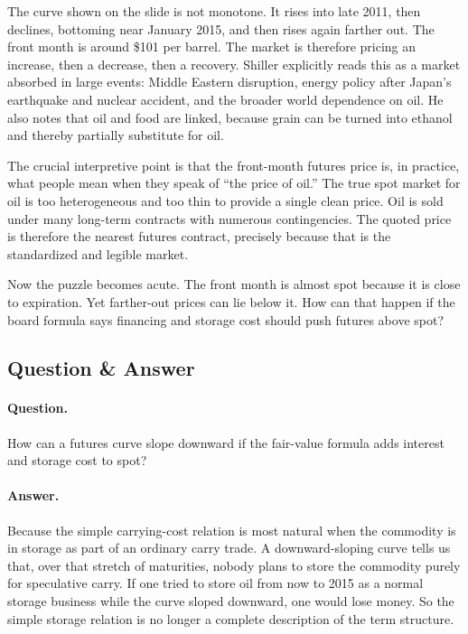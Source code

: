The curve shown on the slide is not monotone. It rises into late 2011, then declines, bottoming near January 2015, and then rises again farther out. The front month is around \$101 per barrel. The market is therefore pricing an increase, then a decrease, then a recovery. Shiller explicitly reads this as a market absorbed in large events: Middle Eastern disruption, energy policy after Japan's earthquake and nuclear accident, and the broader world dependence on oil. He also notes that oil and food are linked, because grain can be turned into ethanol and thereby partially substitute for oil.

The crucial interpretive point is that the front-month futures price is, in practice, what people mean when they speak of ``the price of oil.'' The true spot market for oil is too heterogeneous and too thin to provide a single clean price. Oil is sold under many long-term contracts with numerous contingencies. The quoted price is therefore the nearest futures contract, precisely because that is the standardized and legible market.

Now the puzzle becomes acute. The front month is almost spot because it is close to expiration. Yet farther-out prices can lie below it. How can that happen if the board formula says financing and storage cost should push futures above spot?

\subsection{Question \& Answer}

\paragraph{Question.} How can a futures curve slope downward if the fair-value formula adds interest and storage cost to spot?

\paragraph{Answer.} Because the simple carrying-cost relation is most natural when the commodity is in storage as part of an ordinary carry trade. A downward-sloping curve tells us that, over that stretch of maturities, nobody plans to store the commodity purely for speculative carry. If one tried to store oil from now to 2015 as a normal storage business while the curve sloped downward, one would lose money. So the simple storage relation is no longer a complete description of the term structure.

